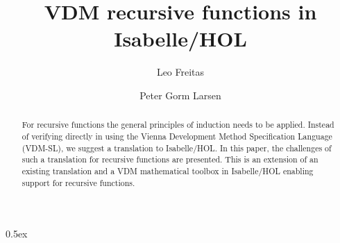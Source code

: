 \documentclass[runningheads,a4paper]{llncs}
\begin{document}
\title{VDM recursive functions in Isabelle/HOL}
\author{Leo Freitas \and Peter Gorm Larsen}

\authorrunning{ }

			
\maketitle
\setcounter{footnote}{0} 
\begin{abstract}
For recursive functions the general principles of induction needs to be applied. Instead of verifying directly in using the Vienna Development Method Specification Language (VDM-SL), we suggest a translation to Isabelle/HOL. In this paper, the challenges of such a translation for recursive functions are presented. This is an extension of an existing translation and a VDM mathematical toolbox in Isabelle/HOL enabling support for recursive functions.
\end{abstract}



\parindent 0pt\parskip 0.5ex




 
\end{document}
